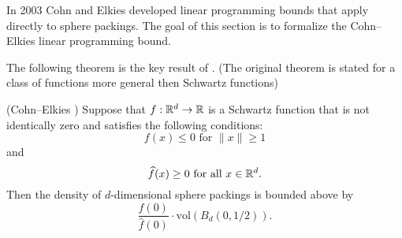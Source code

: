 In 2003 Cohn and Elkies \cite{ElkiesCohn}  developed  linear programming bounds that apply directly to sphere packings. The goal of this section is to formalize the Cohn--Elkies linear programming bound.

The following theorem is the key result of \cite{ElkiesCohn}. (The original theorem is stated for a   class of functions more general then Schwartz functions)
\begin{theorem}\label{thm:Cohn-Elkies}\leanok
(Cohn--Elkies \cite{ElkiesCohn}) Suppose that  $f:\mathbb{R}^d\to\mathbb{R}$ is a Schwartz function that is not identically zero and satisfies the following conditions:
\begin{equation}\label{eqn:Cohn-Elkies-condition-1}f(x)\leq 0\mbox{ for } \|x\|\geq 1\end{equation} and
\begin{equation}\label{eqn:Cohn-Elkies-condition-2}\widehat{f}(x)\geq0\mbox{ for all } x\in\mathbb{R}^d.\end{equation}
  Then the density of $d$-dimensional
  sphere packings is bounded above by $$\frac{f(0)}{\widehat{f}(0)}\cdot \mathrm{vol}(B_d(0,1/2)).$$
\end{theorem}
